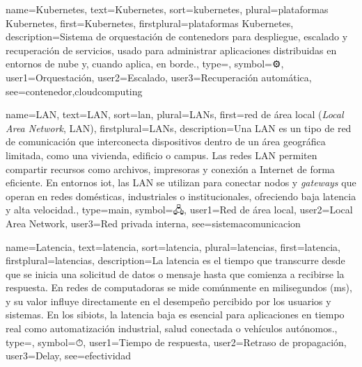 	
	{
		name={Kubernetes},
		text={Kubernetes},
		sort={kubernetes},
		plural={plataformas Kubernetes},
		first={Kubernetes},
		firstplural={plataformas Kubernetes},
		description={Sistema de orquestaci{\'o}n de \glspl{contenedor} para despliegue, escalado y recuperaci{\'o}n de servicios, usado para administrar aplicaciones distribuidas en entornos de nube y, cuando aplica, en borde.},
		type=\glsdefaulttype,
		symbol={⚙️},
		user1={Orquestaci{\'o}n},
		user2={Escalado},
		user3={Recuperaci{\'o}n autom{\'a}tica},
		see={contenedor,cloudcomputing}
	}
	
	{
		name={LAN},
		text={LAN},
		sort={lan},
		plural={LANs},
		first={red de {\'a}rea local (\textit{Local Area Network}, LAN)},
		firstplural={LANs},
		description={Una LAN es un tipo de red de comunicaci{\'o}n que interconecta dispositivos dentro de un {\'a}rea geogr{\'a}fica limitada, como una vivienda, edificio o campus. Las redes LAN permiten compartir recursos como archivos, impresoras y conexi{\'o}n a Internet de forma eficiente. En entornos \gls{iot}, las LAN se utilizan para conectar nodos y \textit{gateways} que operan en redes dom{\'e}sticas, industriales o institucionales, ofreciendo baja latencia y alta velocidad.},
		type=main,
		symbol={🖧},
		user1={Red de {\'a}rea local},
		user2={Local Area Network},
		user3={Red privada interna},
		see={sistemacomunicacion}
	}
	
	{
		name={Latencia},
		text={latencia},
		sort={latencia},
		plural={latencias},
		first={latencia},
		firstplural={latencias},
		description={La latencia es el tiempo que transcurre desde que se inicia una solicitud de datos o mensaje hasta que comienza a recibirse la respuesta. En redes de computadoras se mide com{\'u}nmente en milisegundos (ms), y su valor influye directamente en el desempe{\~n}o percibido por los usuarios y sistemas. En los \glspl{sibiot}, la latencia baja es esencial para aplicaciones en tiempo real como automatizaci{\'o}n industrial, salud conectada o veh{\'i}culos aut{\'o}nomos.},
		type=\glsdefaulttype,
		symbol={⏱},
		user1={Tiempo de respuesta},
		user2={Retraso de propagaci{\'o}n},
		user3={Delay},
		see={efectividad}
	}
	
